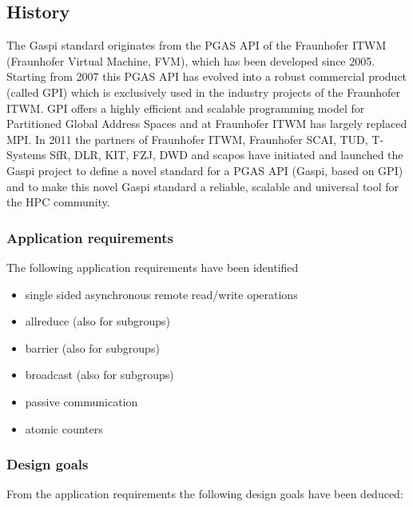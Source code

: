 \documentclass{article}
\newlength{\st}\setlength{\st}{0pt}
\newcommand{\GASPI}{{\sc Gaspi}}
\begin{document}
\subsection{History}
The \GASPI{} standard originates from the PGAS API of the Fraunhofer ITWM (Fraunhofer Virtual Machine, FVM), 
which has been developed since 2005. Starting from 2007 this PGAS API has evolved into a robust commercial 
product (called GPI) which is exclusively used in the industry projects of the Fraunhofer ITWM. GPI offers a 
highly efficient and scalable programming model for Partitioned Global Address Spaces and at Fraunhofer ITWM 
 has largely replaced MPI. In 2011 the partners of Fraunhofer ITWM, Fraunhofer SCAI, TUD, T-Systems SfR, DLR, KIT,
 FZJ, DWD and scapos have initiated and launched the \GASPI{} project to define a novel standard for a PGAS API 
(\GASPI{}, based on GPI) and to make this novel \GASPI{} standard a reliable, scalable and universal tool for the
 HPC community. 

\subsubsection{Application requirements}

The following application requirements have been identified

\begin{itemize}
\item single sided asynchronous remote read/write operations
\item allreduce (also for subgroups)
\item barrier (also for subgroups)
\item broadcast (also for subgroups)
\item passive communication
\item atomic counters
\end{itemize}


\subsubsection{Design goals}

From the application requirements the following design goals have been deduced:
\end{document}

